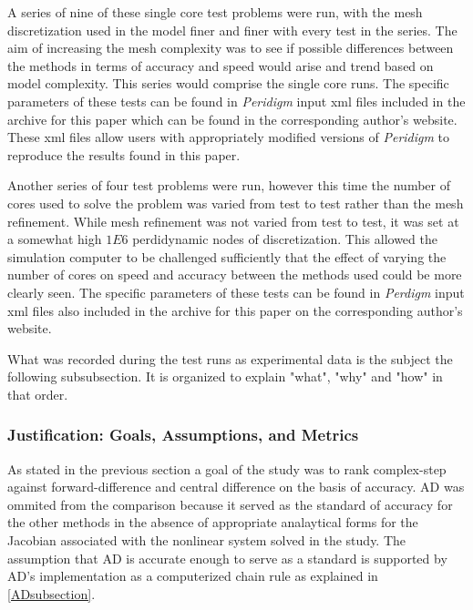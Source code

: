 \documentclass[preprint,12pt]{elsarticle}
\begin{document}
A series of nine of these single core test problems were run, with the mesh discretization used in
the model finer and finer with every test in the series. The aim of increasing the mesh complexity
was to see if possible differences between the methods in terms of accuracy and speed would arise
and trend based on model complexity. This series would comprise the single core runs. The specific
parameters of these tests can be found in \emph{Peridigm} input xml files included in the archive
for this paper which can be found in the corresponding author's website. These xml files allow users
with appropriately modified versions of \emph{Peridigm} to reproduce the results found in this
paper.

Another series of four test problems were run, however this time the number of cores used to solve
the problem was varied from test to test rather than the mesh refinement. While mesh refinement was
not varied from test to test, it was set at a somewhat high $1E6$ perdidynamic nodes of
discretization. This allowed the simulation computer to be challenged sufficiently that the effect
of varying the number of cores on speed and accuracy between the methods used could be more clearly
seen. The specific parameters of these tests can be found in \emph{Perdigm} input xml files also
included in the archive for this paper on the corresponding author's website.

What was recorded during the test runs as experimental data is the subject the following
subsubsection. It is organized to explain "what", "why" and "how" in that order.

\subsubsection{Justification: Goals, Assumptions, and Metrics} \label{JGAM} As stated in the
previous section a goal of the study was to rank complex-step against forward-difference and central
difference on the basis of accuracy. AD was ommited from the comparison because it served as the
standard of accuracy for the other methods in the absence of appropriate analaytical forms for the
Jacobian associated with the nonlinear system solved in the study. The assumption that AD is
accurate enough to serve as a standard is supported by AD's implementation as a computerized chain
rule as explained in \ref{ADsubsection}.
\end{document}
